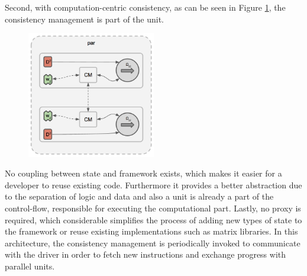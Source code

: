 Second, with computation-centric consistency, as can be seen in Figure \ref{fig:computation_centric_consistency}, the consistency management is part of the unit.
\begin{figure}[ht]
\centering
\includegraphics[width=0.5\textwidth]{img/computation_centric_consist.png}
\caption{}
\label{fig:computation_centric_consistency}
\end{figure}
No coupling between state and framework exists, which makes it easier for a developer to reuse existing code.
Furthermore it provides a better abstraction due to the separation of logic and data and also a unit is already a part of the control-flow, responsible for executing the computational part.
Lastly, no proxy is required, which considerable simplifies the process of adding new types of state to the framework or reuse existing implementations such as matrix libraries.
In this architecture, the consistency management is periodically invoked to communicate with the driver in order to fetch new instructions and exchange progress with parallel units.

